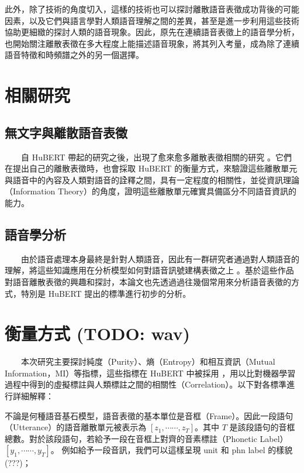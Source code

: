 {{        此外，除了技術的角度切入，這樣的技術也可以探討離散語音表徵成功背後的可能因素，以及它們與語言學對人類語音理解之間的差異，甚至是進一步利用這些技術協助更細緻的探討人類的語音現象。因此，原先在連續語音表徵上的語音學分析，也開始關注離散表徵在多大程度上能描述語音現象，將其列入考量，成為除了連續語音特徵和時頻譜之外的另一個選擇。

}  %
\section{相關研究}  

\subsection{無文字與離散語音表徵}

　　自 HuBERT 帶起的研究之後，出現了愈來愈多離散表徵相關的研究\cite{10097097, abdullah23_interspeech, chang_exploration_2023, liu2024dinosr, zhang2024speechtokenizer, huang2023repcodec} 。它們在提出自己的離散表徵時，也會採取 HuBERT 的衡量方式，來驗證這些離散單元與語音中的內容及人類對語音的詮釋之間，具有一定程度的相關性，並從資訊理論（Information Theory）的角度，證明這些離散單元確實具備區分不同語音資訊的能力。

\subsection{語音學分析}

　　由於語音處理本身最終是針對人類語音，因此有一群研究者通過對人類語音的理解，將這些知識應用在分析模型如何對語音訊號建構表徵之上\cite{deseyssel22_interspeech, wells_phonetic_2022, 10097097, abdullah23_interspeech} 。基於這些作品對語音離散表徵的興趣和探討，本論文也先透過過往幾個常用來分析語音表徵的方式，特別是 HuBERT \cite{hsu_hubert_2021-2} 提出的標準進行初步的分析。


\section{衡量方式 (TODO: wav)}

　　本次研究主要探討純度（Purity）、熵（Entropy）和相互資訊（Mutual Information，MI）等指標，這些指標在 HuBERT 中被採用 \cite{hsu_hubert_2021, hsu_hubert_2021-2}，用以比對機器學習過程中得到的虛擬標註與人類標註之間的相關性（Correlation）。以下對各標準進行詳細解釋：

        不論是何種語音基石模型，語音表徵的基本單位是音框（Frame）。因此一段語句（Utterance）的語音離散單元被表示為 $[z_1, \cdots\cdots, z_T]$。其中 $T$ 是該段語句的音框總數。對於該段語句，若給予一段在音框上對齊的音素標註（Phonetic Label） $[y_1, \cdots\cdots, y_T]$。
        例如給予一段音訊，我們可以這樣呈現 unit 和 phn label 的樣貌 (???)；
        
}
